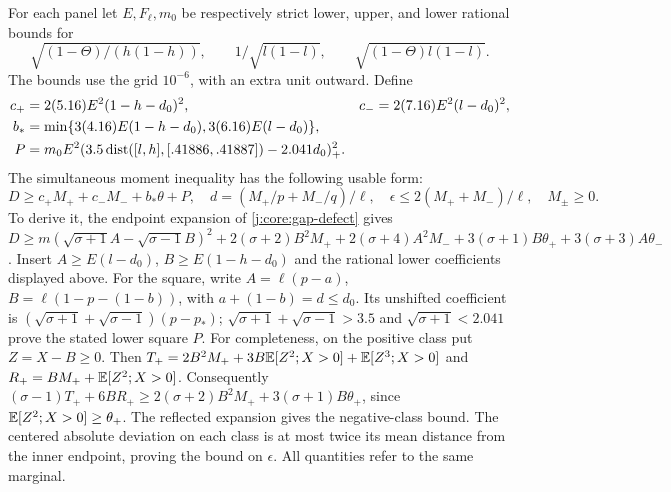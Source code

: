 For each panel let $E,F_\ell,m_0$ be respectively strict lower, upper,
and lower rational bounds for
\[
 \sqrt{(1-\Theta)/(h(1-h))},\qquad
 1/\sqrt{l(1-l)},\qquad \sqrt{(1-\Theta)l(1-l)}.
\]
The bounds use the grid $10^{-6}$, with an extra unit outward. Define
\begin{align*}
 c_+&=2(5.16)E^2(1-h-d_0)^2,&
 c_-&=2(7.16)E^2(l-d_0)^2,\\
 b_*&=\min\{3(4.16)E(1-h-d_0),3(6.16)E(l-d_0)\},\\
 P&=m_0E^2(3.5\operatorname{dist}([l,h],[.41886,.41887])-2.041d_0)_+^2.
\end{align*}
The simultaneous moment inequality has the following usable form:
\begin{equation}\label{j:local:conf:moment}
 D\ge c_+M_++c_-M_-+b_*\theta+P,\quad
 d=(M_+/p+M_-/q)/\ell,\quad
 \epsilon\le2(M_++M_-)/\ell,\quad M_\pm\ge0.
\end{equation}
To derive it, the endpoint expansion of \eqref{j:core:gap-defect} gives
$D\ge m(\sqrt{\sigma+1}A-\sqrt{\sigma-1}B)^2
+2(\sigma+2)B^2M_++2(\sigma+4)A^2M_-
+3(\sigma+1)B\theta_++3(\sigma+3)A\theta_-$.
Insert $A\ge E(l-d_0)$, $B\ge E(1-h-d_0)$ and the rational lower
coefficients displayed above. For the square, write
$A=\ell(p-a)$, $B=\ell(1-p-(1-b))$, with
$a+(1-b)=d\le d_0$. Its unshifted coefficient is
$(\sqrt{\sigma+1}+\sqrt{\sigma-1})(p-p_*)$;
$\sqrt{\sigma+1}+\sqrt{\sigma-1}>3.5$ and
$\sqrt{\sigma+1}<2.041$ prove the stated lower square $P$.
For completeness, on the positive class put $Z=X-B\ge0$.
Then $T_+=2B^2M_++3B\mathbb E[Z^2;X>0]+\mathbb E[Z^3;X>0]$ and
$R_+=BM_++\mathbb E[Z^2;X>0]$. Consequently
$(\sigma-1)T_++6BR_+\ge2(\sigma+2)B^2M_+
+3(\sigma+1)B\theta_+$, since $\mathbb E[Z^2;X>0]\ge\theta_+$.
The reflected expansion gives the negative-class bound.
The centered absolute deviation on each class is at most twice its
mean distance from the inner endpoint, proving the bound on $\epsilon$.
All quantities refer to the same marginal.

